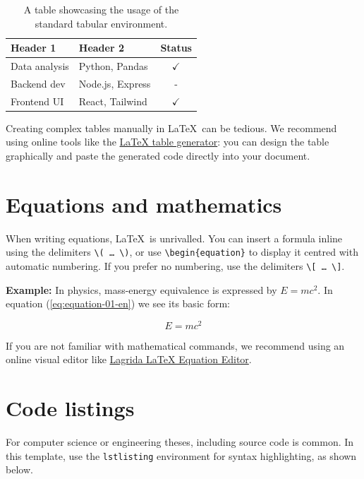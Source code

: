 {	\begin{table}[!htpb]
		\caption{A table showcasing the usage of the standard tabular environment.}
		\label{tab:table-01-en}
		\centering
		\begin{tabular}{llc}
			\toprule
			\textbf{Header 1} & \textbf{Header 2} & \textbf{Status} \\ 
			\midrule
			Data analysis      & Python, Pandas     & $\checkmark$  \\
			Backend dev        & Node.js, Express   & -             \\
			Frontend UI        & React, Tailwind    & $\checkmark$  \\
			\bottomrule
		\end{tabular}
	\end{table}
	
	Creating complex tables manually in \LaTeX\ can be tedious. We recommend using online tools like the \href{https://www.tablesgenerator.com/}{LaTeX table generator}: you can design the table graphically and paste the generated code directly into your document.
	
	\section{Equations and mathematics}
	When writing equations, \LaTeX\ is unrivalled. You can insert a formula inline using the delimiters \texttt{\textbackslash( \ldots\ \textbackslash)}, or use \texttt{\textbackslash begin\{equation\}} to display it centred with automatic numbering. If you prefer no numbering, use the delimiters \texttt{\textbackslash[ \ldots\ \textbackslash]}.
	
	\vspace{.875em}
	\textbf{Example:} In physics, mass-energy equivalence is expressed by \(E=mc^2\). In equation (\ref{eq:equation-01-en}) we see its basic form:
	
	\begin{equation}
		\label{eq:equation-01-en}
		E=mc^2
	\end{equation}
	
	If you are not familiar with mathematical commands, we recommend using an online visual editor like \href{https://latexeditor.lagrida.com/}{Lagrida LaTeX Equation Editor}.
	
	\section{Code listings}
	For computer science or engineering theses, including source code is common. In this template, use the \texttt{lstlisting} environment for syntax highlighting, as shown below.
}

